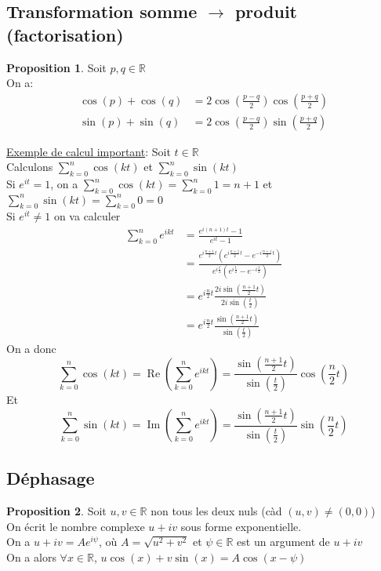 \documentclass[10pt,a4paper]{article}
\theoremstyle{definition}
\newtheorem{proposition}{Proposition}[section]
\DeclareMathOperator{\re}{Re}
\DeclareMathOperator{\im}{Im}
\begin{document}
\subsection{Transformation somme $\rightarrow$ produit (factorisation)}
\begin{proposition}
Soit $p, q \in \mathbb{R}$ \\
On a:
\begin{align*}
\cos(p) + \cos(q) &= 2\cos\left(\frac{p - q}{2}\right) \cos\left(\frac{p + q}{2}\right) \\
\sin(p) + \sin(q) &= 2\cos\left(\frac{p - q}{2}\right) \sin\left(\frac{p + q}{2}\right)
\end{align*}
\end{proposition}
\noindent \uline{Exemple de calcul important}: Soit $t \in \mathbb{R}$ \\
Calculons $\sum\limits_{k = 0}^n \cos(kt)$ et $\sum\limits_{k = 0}^n \sin(kt)$ \\
Si $e^{it} = 1$, on a $\sum\limits_{k = 0}^n \cos(kt) = \sum\limits_{k = 0}^n 1 = n + 1$ et $\sum\limits_{k = 0}^n \sin(kt) = \sum\limits_{k = 0}^n 0 = 0$ \\
Si $e^{it} \neq 1$ on va calculer
\begin{align*}
\sum_{k = 0}^n e^{ikt} &= \frac{e^{i(n + 1)t} - 1}{e^{it} - 1} \\
&= \frac{e^{i \frac{n + 1}{2}t} \left( e^{i\frac{n + 1}{2}t} - e^{-i\frac{n + 1}{2} t}\right)}{e^{i\frac{t}{2}}\left(e^{i\frac{t}{2}} - e^{-i\frac{t}{2}}\right)} \\
&= e^{i\frac{n}{2}t} \frac{2i\sin\left(\frac{n + 1}{2}t\right)}{2i\sin\left(\frac{t}{2}\right)} \\
&= e^{i\frac{n}{2}t} \frac{\sin\left(\frac{n + 1}{2}t\right)}{\sin\left(\frac{t}{2}\right)}
\end{align*}
On a donc
\[ \sum_{k = 0}^n \cos(kt) = \re\left(\sum_{k = 0}^n e^{ikt}\right) = \frac{\sin\left(\frac{n + 1}{2}t\right)}{\sin\left(\frac{t}{2}\right)} \cos\left(\frac{n}{2}t\right) \]
Et
\[ \sum_{k = 0}^n \sin(kt) = \im\left(\sum_{k = 0}^n e^{ikt}\right) = \frac{\sin\left(\frac{n + 1}{2}t\right)}{\sin\left(\frac{t}{2}\right)} \sin\left(\frac{n}{2}t\right) \]

\subsection{Déphasage}
\begin{proposition}
Soit $u, v \in \mathbb{R}$ non tous les deux nuls (càd $(u, v) \neq (0, 0)$) \\
On écrit le nombre complexe $u + iv$ sous forme exponentielle. \\
On a $u + iv = Ae^{i\psi}$, où $A = \sqrt{u^2 + v^2}$ et $\psi \in \mathbb{R}$ est un argument de $u + iv$ \\
On a alors $\forall x \in \mathbb{R}$, $u\cos(x) + v\sin(x) = A\cos(x - \psi)$
\end{proposition}
\end{document}
